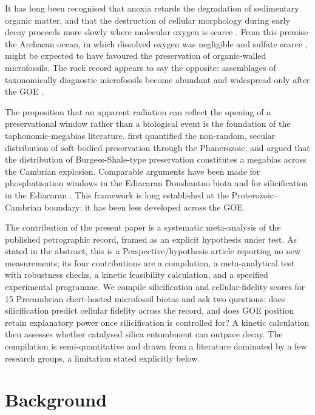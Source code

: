 \documentclass[11pt]{article}
\begin{document}
It has long been recognised that anoxia retards the degradation of sedimentary organic matter, and
that the destruction of cellular morphology during early decay proceeds more slowly where molecular
oxygen is scarce \citep{Canfield1994,Hedges1995}. From this premise the Archaean ocean, in which
dissolved oxygen was negligible \citep{Pavlov2002} and sulfate scarce \citep{Habicht2002,Crowe2014},
might be expected to have favoured the preservation of organic-walled microfossils. The rock record
appears to say the opposite: assemblages of taxonomically diagnostic microfossils become abundant
and widespread only after the GOE \citep{Javaux2018,Wacey2014}.

The proposition that an apparent radiation can reflect the opening of a preservational window rather
than a biological event is the foundation of the taphonomic-megabias literature. \citet{Allison1993}
first quantified the non-random, secular distribution of soft-bodied preservation through the
Phanerozoic, and \citet{Butterfield2003} argued that the distribution of Burgess-Shale-type
preservation constitutes a megabias across the Cambrian explosion. Comparable arguments have been
made for phosphatisation windows in the Ediacaran Doushantuo biota and for silicification in the
Ediacaran \citep{Tarhan2016}. This framework is long established at the Proterozoic--Cambrian
boundary; it has been less developed across the GOE.

The contribution of the present paper is a systematic meta-analysis of the published petrographic
record, framed as an explicit hypothesis under test. As stated in the abstract, this is a
Perspective/hypothesis article reporting no new measurements; its four contributions are a
compilation, a meta-analytical test with robustness checks, a kinetic feasibility calculation, and a
specified experimental programme. We compile silicification and cellular-fidelity scores for 15
Precambrian chert-hosted microfossil biotas and ask two questions: does silicification predict
cellular fidelity across the record, and does GOE position retain explanatory power once
silicification is controlled for? A kinetic calculation then assesses whether catalysed silica
entombment can outpace decay. The compilation is semi-quantitative and drawn from a literature
dominated by a few research groups, a limitation stated explicitly below.

\section{Background}
\end{document}
